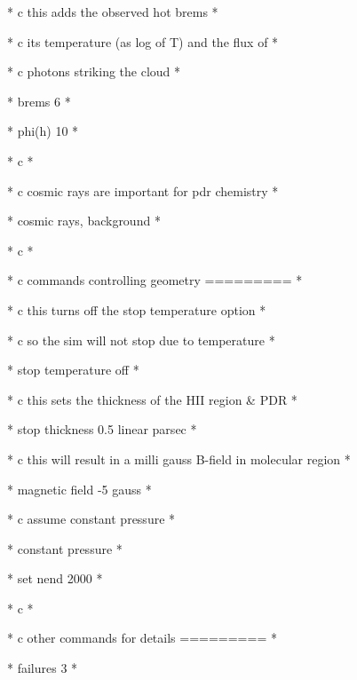 {                       * c this adds the observed hot brems            
*

                       * c its temperature (as log of T) and the flux of
*

                       * c photons striking the cloud                  
*

                       * brems 6                                       
*

                       * phi(h) 10                                     
*

                       * c                                             
*

                       * c cosmic rays are important for pdr chemistry 
*

                       * cosmic rays, background                       
*

                       * c                                             
*

                       * c commands controlling geometry  =========    
*

                       * c this turns off the stop temperature option  
*

                       * c so the sim will not stop due to temperature 
*

                       * stop temperature off                          
*

                       * c this sets the thickness of the HII region \&
PDR                               *

                       * stop thickness 0.5 linear parsec              
*

                       * c this will result in a milli gauss B-field in
molecular region                 *

                       * magnetic field -5 gauss                       
*

                       * c assume constant pressure                    
*

                       * constant pressure                             
*

                       * set nend 2000                                 
*

                       * c                                             
*

                       * c other commands for details     =========    
*

                       * failures 3                                    
*

}
